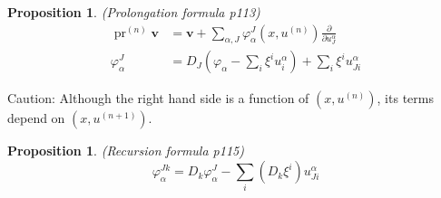\documentclass[12pt]{article}
\numberwithin{equation}{section}
\theoremstyle{plain}
\newtheorem{proposition}[definition]{Proposition}
\newtheorem{formula}{Formula}[section]
\theoremstyle{definition}
\newtheorem{note}{Note}
\begin{document}


\begin{proposition}\label{proform} \emph{(Prolongation formula \cite{olver} p113)}
\vspace{-0.8pc}
\begin{align*}
\operatorname{pr}^{(n)}\mathbf{v} &= \mathbf{v} + \sum_{\alpha,J}\varphi^{J}_{\alpha}(x,u^{(n)})\frac{\partial}{\partial u^{\alpha}_{J}}\\
\varphi^{J}_{\alpha} &= D_{J}(\varphi_{\alpha} - \sum_i \xi^{i}u^{\alpha}_i) + \sum_i \xi^{i} u^{\alpha}_{Ji}
\end{align*}
\end{proposition}

Caution: Although the right hand side is a function of $(x,u^{(n)})$, its terms depend on $(x,u^{(n+1)})$.


\begin{proposition}\label{proformrecurse}\emph{(Recursion formula \cite{olver} p115)}
\[\varphi^{Jk}_{\alpha}=D_k\varphi^{J}_\alpha -\sum_i (D_k\xi^{i})u^{\alpha}_{Ji}\]
\end{proposition}


\end{document}
